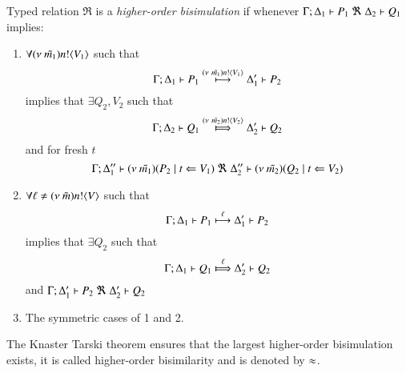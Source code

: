 \begin{definition}\rm
	\label{def:bisim}
	Typed relation
	$\Re$ is a {\em higher-order bisimulation} if whenever
	$\horel{\Gamma}{\Delta_1}{P_1}{\ \Re\ }{\Delta_2}{Q_1}$ implies:
%
	\begin{enumerate}
		\item	$\forall (\nu\ \tilde{m_1}) n ! \langle V_1 \rangle$ such that
			\[
				\Gamma; \Delta_1 \vdash P_1 \stackrel{(\nu\ \tilde{m_1}) n ! \langle V_1 \rangle}{\longmapsto} \Delta_1' \vdash P_2
			\]
			implies that $\exists Q_2, V_2$ such that
			\[
				\horel{\Gamma}{\Delta_2}{Q_1}{\Hby{\news{\tilde{m_2}} \bactout{n}{V_2}}}{\Delta_2'}{Q_2}
			\]
			and for fresh $t$
			\[
				\Gamma; \Delta_1'' \vdash (\nu\ \tilde{m_1})(P_2 \;|\; t \Leftarrow V_1) \ \Re\  \Delta_2'' \vdash{(\nu\ \tilde{m_2})(Q_2 \;|\;t \Leftarrow V_2)}
			\]
%
		\item	$\forall \ell \not= (\nu\ \tilde{m}) n ! \langle V \rangle$ such that
			\[
				\Gamma; \Delta_1 \vdash P_1 \stackrel{\ell}{\longmapsto} \Delta_1' \vdash P_2
			\]
			implies that $\exists Q_2$ such that 
			\[
				\horel{\Gamma}{\Delta_1}{Q_1}{\Hby{\ell}}{\Delta_2'}{Q_2}
			\]
			and
			$\horel{\Gamma}{\Delta_1'}{P_2}{\ \Re\ }{\Delta_2'}{Q_2}$

		\item	The symmetric cases of 1 and 2.
	\end{enumerate}
	The Knaster Tarski theorem ensures that the largest higher-order bisimulation exists,
	it is called higher-order bisimilarity and is denoted by $\approx$.
\end{definition}



